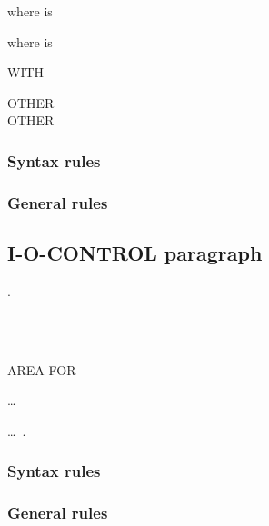 where  is

\begin{syntax}
\end{syntax}

where  is

\begin{syntax}
   WITH
  \begin{1=}
     OTHER \\
     OTHER \\
     
  \end{1=}
\end{syntax}

\subsubsection{Syntax rules}

\subsubsection{General rules}

\subsection{I-O-CONTROL paragraph}
\begin{syntax}
  \begin{0-1}
    .
  \end{0-1}\newline
  \begin{1=}
    \begin{0-1}
       \\
       \\
    \end{0-1}
    AREA FOR
    \begin{1=}
      \filename
    \end{1=}\ldots \\

  \end{1=}\ldots\ {}.
\end{syntax}

\subsubsection{Syntax rules}

\subsubsection{General rules}

